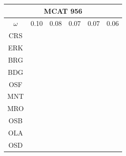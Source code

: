 \documentclass[12pt]{article}
\begin{document}
\begin{landscape}
\begin{figure}
\begin{minipage}[c]{0.3\textwidth}
\hspace*{-2.5cm}
\begin{tabular}{|c|c|c|c|c|c|}%
         \hline \multicolumn{6}{|c|}{MCAT 956} \\ \hline
         $\omega$&0.10&0.08&0.07&0.07&0.06\\ \hline %
        CRS&\cellcolor[HTML]{E41A1C}&\cellcolor[HTML]{E41A1C}&\cellcolor[HTML]{E41A1C}&\cellcolor[HTML]{E41A1C}&\cellcolor[HTML]{E41A1C}\\ \hline %
        ERK&\cellcolor[HTML]{377EB8}&\cellcolor[HTML]{E41A1C}&\cellcolor[HTML]{E41A1C}&\cellcolor[HTML]{E41A1C}&\cellcolor[HTML]{E41A1C}\\ \hline %
        BRG&\cellcolor[HTML]{4DAF4A}&\cellcolor[HTML]{377EB8}&\cellcolor[HTML]{377EB8}&\cellcolor[HTML]{377EB8}&\cellcolor[HTML]{377EB8}\\ \hline %
        BDG&\cellcolor[HTML]{4DAF4A}&\cellcolor[HTML]{377EB8}&\cellcolor[HTML]{377EB8}&\cellcolor[HTML]{377EB8}&\cellcolor[HTML]{377EB8}\\ \hline %
        OSF&\cellcolor[HTML]{4DAF4A}&\cellcolor[HTML]{377EB8}&\cellcolor[HTML]{4DAF4A}&\cellcolor[HTML]{377EB8}&\cellcolor[HTML]{4DAF4A}\\ \hline %
        MNT&\cellcolor[HTML]{984EA3}&\cellcolor[HTML]{4DAF4A}&\cellcolor[HTML]{4DAF4A}&\cellcolor[HTML]{4DAF4A}&\cellcolor[HTML]{4DAF4A}\\ \hline %
        MRO&\cellcolor[HTML]{984EA3}&\cellcolor[HTML]{4DAF4A}&\cellcolor[HTML]{4DAF4A}&\cellcolor[HTML]{4DAF4A}&\cellcolor[HTML]{4DAF4A}\\ \hline %
        OSB&\cellcolor[HTML]{984EA3}&\cellcolor[HTML]{984EA3}&\cellcolor[HTML]{984EA3}&\cellcolor[HTML]{4DAF4A}&\cellcolor[HTML]{984EA3}\\ \hline %
        OLA&\cellcolor[HTML]{FF7F00}&\cellcolor[HTML]{984EA3}&\cellcolor[HTML]{984EA3}&\cellcolor[HTML]{984EA3}&\cellcolor[HTML]{984EA3}\\ \hline %
        OSD&\cellcolor[HTML]{FF7F00}&\cellcolor[HTML]{984EA3}&\cellcolor[HTML]{984EA3}&\cellcolor[HTML]{FF7F00}&\cellcolor[HTML]{FF7F00}\\ \hline %
\end{tabular}\\$~$\\$~$\\
\hspace*{-2.5cm}
\begin{tabular}{|c|c|c|c|c|c|}                                                                                                        

\end{tabular}
\end{minipage}
\end{figure}
\end{landscape}
\end{document}

